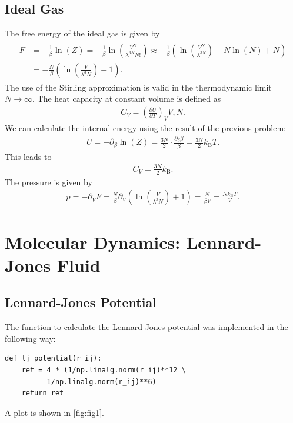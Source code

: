 \documentclass[a4paper,10pt,bibtotoc]{scrartcl}
\begin{document}
\subsection{Ideal Gas}
The free energy of the ideal gas is given by
\begin{align}
\begin{split}
 F &= -\frac{1}{\beta}\ln\left(Z\right) = -\frac{1}{\beta}\ln\left(\frac{V^N}{\lambda^{3N}N!} \right) \approx  -\frac{1}{\beta}\left(\ln\left(\frac{V^N}{\lambda^{3N}}\right) -N\ln\left(N\right) + N\right)\\
 &= -\frac{N}{\beta}\left(\ln\left(\frac{V}{\lambda^{3}N}\right) + 1\right).
\end{split}
\end{align}
The use of the Stirling approximation is valid in the thermodynamic limit $N\rightarrow \infty$.
The heat capacity at constant volume is defined as
\begin{align}
C_V = \left( \frac{\partial U}{\partial T}\right)_V{V,N}.
\end{align}
We can calculate the internal energy using the result of the previous problem:
\begin{align}
 U = -\partial_\beta \ln\left(Z\right) =\frac{3N}{2}\cdot\frac{\partial_\beta \beta}{\beta} = \frac{3N}{2} k_\mathrm{B}T.
\end{align}
This leads to
\begin{align}
C_V = \frac{3N}{2} k_\mathrm{B}.
\end{align}
The pressure is given by
\begin{align}
p = -\partial_V F = \frac{N}{\beta}\partial_V\left(\ln\left(\frac{V}{\lambda^{3}N}\right) + 1\right) = \frac{N}{\beta V} = \frac{Nk_\mathrm{B}T}{V}.
\end{align}

\section{Molecular Dynamics: Lennard-Jones Fluid}
\subsection{Lennard-Jones Potential}
The function to calculate the Lennard-Jones potential was implemented in the following way:
\begin{lstlisting}
def lj_potential(r_ij):
    ret = 4 * (1/np.linalg.norm(r_ij)**12 \
        - 1/np.linalg.norm(r_ij)**6)
    return ret
\end{lstlisting}
A plot is shown in \autoref{fig:fig1}.
\end{document}
